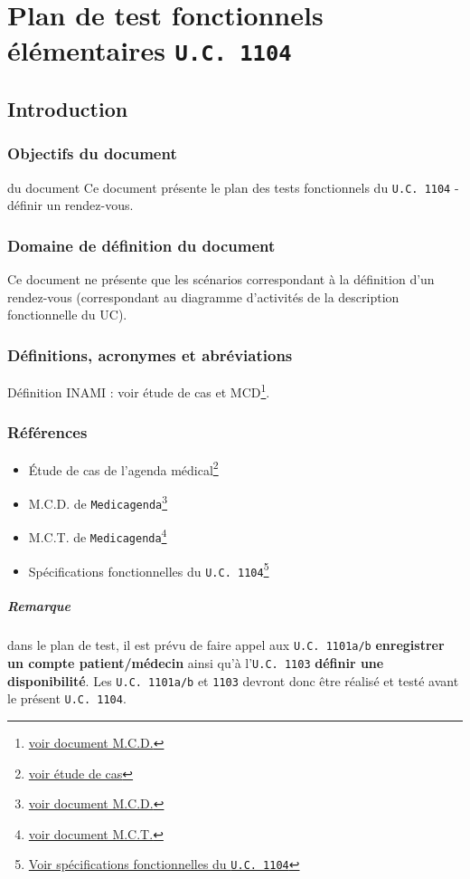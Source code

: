 \chapter{Plan de test fonctionnels élémentaires \texttt{U.C. 1104}}
\section{Introduction}
\subsection{Objectifs du document}
du document Ce document présente  le plan des tests fonctionnels du \texttt{U.C. 1104} -
définir un rendez-vous. 
\subsection{Domaine de définition du document}
Ce document ne présente que les scénarios correspondant à la définition d’un
rendez-vous (correspondant au diagramme d’activités de la description fonctionnelle
du UC).
\subsection{Définitions, acronymes et abréviations}
Définition INAMI : voir étude de cas et MCD\footnote{\href{../MCD/MCD.pdf}{voir document M.C.D.}}.
\subsection{Références}
\begin{itemize}
	\item[] Étude de cas de l'agenda
		médical\footnote{\href{../Enonce_Travail_Synthese_14-15.pdf}{voir
		étude de cas}}
	\item[] M.C.D. de \texttt{Medicagenda}\footnote{\href{../MCD/MCD.pdf}{voir document M.C.D.}}
	\item[] M.C.T. de \texttt{Medicagenda}\footnote{\href{./MCT.pdf}{voir document M.C.T.}}
	\item[] Spécifications fonctionnelles du \texttt{U.C.
		1104}\footnote{\href{./specifications_fonctionnelles_UC_1104_definir_un_rendez-vous.pdf}{Voir
			spécifications fonctionnelles du \texttt{U.C. 1104}}}
	\end{itemize}

	\paragraph{Remarque}
	dans le plan de test, il est prévu de faire appel aux \texttt{U.C. 1101a/b} 
	\textbf{enregistrer un compte patient/médecin} ainsi qu'à l'\texttt{U.C. 1103}
	\textbf{définir une disponibilité}.
	Les \texttt{U.C. 1101a/b} et \texttt{1103} devront
	donc être réalisé et testé avant le présent \texttt{U.C. 1104}.


